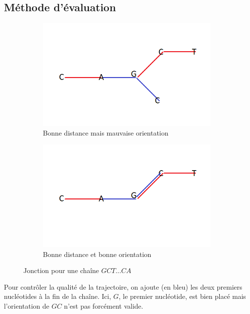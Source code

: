 \documentclass[graphics]{beamer}
\begin{document}
\subsection{Méthode d'évaluation}

\begin{frame}
	\begin{figure}[H]
		\centering
		\begin{subfigure}[b]{0.4\textwidth}
			\centering
			\includegraphics[width=\textwidth]{pb_angle}
			\caption{Bonne distance mais mauvaise orientation}
			\label{fig:y equals x}
		\end{subfigure}
		\begin{subfigure}[b]{0.4\textwidth}
			\centering
			\includegraphics[width=\textwidth]{angle_oui}
			\caption{Bonne distance et bonne orientation}
			\label{fig:three sin x}
		\end{subfigure}
		\caption{Jonction pour une chaîne $GCT...CA$}
		\label{fig:three graphs}
	\end{figure}
Pour contrôler la qualité de la trajectoire, on ajoute (en bleu) les deux premiers nucléotides à la fin de la chaîne. Ici, $G$, le premier nucléotide, est bien placé mais l'orientation de $GC$ n'est pas forcément valide.
\end{frame}
\end{document}
